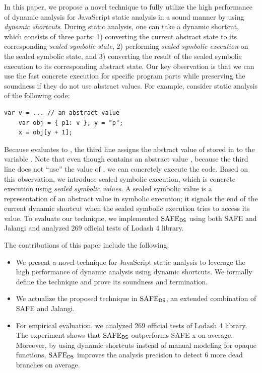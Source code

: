 In this paper, we propose a novel technique to fully utilize
the high performance of dynamic analysis for JavaScript static
analysis in a sound manner by using \textit{dynamic shortcuts}.
During static analysis, one can take a dynamic shortcut, which
consists of three parts: 1) converting the current abstract state to
its corresponding \textit{sealed symbolic state}, 2) performing
\textit{sealed symbolic execution} on the sealed symbolic state, and
3) converting the result of the sealed symbolic execution to its
corresponding abstract state.  Our key observation is that we can use
the fast concrete execution for specific program parts while
preserving the soundness if they do not use abstract values.
For example, consider static analysis of the following code:
\begin{lstlisting}[style=myJSstyle,numbers=none]
    var v = ... // an abstract value
    var obj = { p1: v }, y = "p";
    x = obj[y + 1];
\end{lstlisting}
Because  evaluates to ,
the third line assigns the abstract value of  stored in
 to the variable .
Note that even though  contains an abstract value ,
because the third line does not ``use'' the value of ,
we can concretely execute the code.  Based on this observation,
we introduce sealed symbolic execution, which is concrete execution
using \textit{sealed symbolic values}.  A sealed symbolic value is a
representation of an abstract value in symbolic execution; it signals
the end of the current dynamic shortcut when the sealed symbolic
execution tries to access its value.
To evaluate our technique, we implemented $\text{SAFE}_{\textsf{DS}}$ using both SAFE
and Jalangi and analyzed 269 official tests of Lodash 4 library.

The contributions of this paper include the following:
\begin{itemize}
\item We present a novel technique for JavaScript static
analysis to leverage the high performance of dynamic analysis using
dynamic shortcuts.  We formally define the technique and prove
its soundness and termination.
\item We actualize the proposed technique in $\text{SAFE}_{\textsf{DS}}$, an
extended combination of SAFE and Jalangi.
\item For empirical evaluation, we analyzed 269 official tests of
Lodash 4 library.  The experiment shows that $\text{SAFE}_{\textsf{DS}}$ outperforms
SAFE x on average.  Moreover, by using dynamic shortcuts
instead of manual modeling for  opaque functions,
$\text{SAFE}_{\textsf{DS}}$ improves the analysis precision to detect 6 more dead branches on
average.
\end{itemize}

